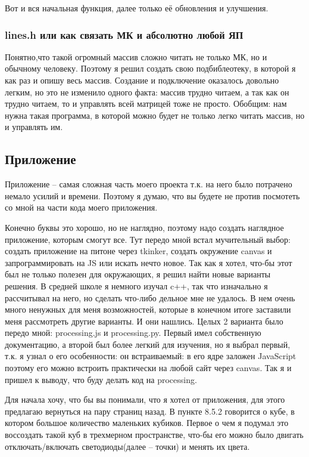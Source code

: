 \documentclass[a4paper, 12pt]{article}
\begin{document}
Вот и вся начальная функция, далее только её обновления и улучшения.

\subsubsection{lines.h или как связать МК и абсолютно любой ЯП}

Понятно,что такой огромный массив сложно читать не только МК, но и обычному
человеку. Поэтому я решил создать свою подбиблеотеку, в которой я как раз 
и опишу весь массив. Создание и подключение оказалось довольно легким, но это
не изменило одного факта: массив трудно читаем, а так как он трудно читаем, то
и управлять всей матрицей тоже не просто. Обобщим: нам нужна такая программа,
в которой можно будет не только легко читать массив, но и управлять им.

\subsection{Приложение}

Приложение -- самая сложная часть моего проекта т.к. на него было потрачено 
немало усилий и времени. Поэтому я думаю, что вы будете не против посмотеть со
мной на части кода моего приложения.

Конечно буквы это хорошо, но не наглядно, поэтому надо создать наглядное 
приложение, которым смогут все. Тут передо мной встал мучительный выбор:
создать приложение на питоне через tkinker, создать окружение canvas и
запрограммировать на JS или искать нечто новое. Так как я хотел, что-бы этот
был не только полезен для окружающих, я решил найти новые варианты решения.
В средней школе я немного изучал c++, так что изначально я рассчитывал на него,
но сделать что-либо дельное мне не удалось. В нем очень много ненужных для
меня возможностей, которые в конечном итоге заставили меня рассмотреть другие
варианты. И они нашлись. Целых 2 варианта было передо мной: processing.js и
processing.py. Первый имел собственную документацию, а второй был более легкий 
для изучения, но я выбрал первый, т.к. я узнал о его особенности: он 
встраиваемый: в его ядре заложен JavaScript поэтому его можно встроить 
практически на любой сайт через canvas. Так я и пришел к выводу, что буду
делать код на processing.

Для начала хочу, что бы вы понимали, что я хотел от приложения, для этого 
предлагаю вернуться на пару страниц назад. В пункте 8.5.2 говорится о кубе,
в котором большое количество маленьких кубиков. Первое о чем я подумал это 
воссоздать такой куб в трехмерном пространстве, что-бы его можно было двигать
отключать/включать светодиоды(далее -- точки) и менять их цвета.
\end{document}
